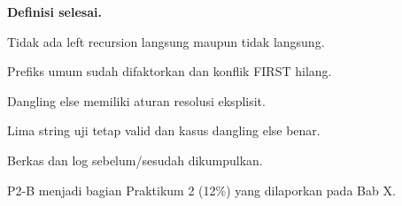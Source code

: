 \textbf{Definisi selesai.}
\begin{checklist}
  \item Tidak ada left recursion langsung maupun tidak langsung.
  \item Prefiks umum sudah difaktorkan dan konflik FIRST hilang.
  \item Dangling else memiliki aturan resolusi eksplisit.
  \item Lima string uji tetap valid dan kasus dangling else benar.
  \item Berkas  dan log sebelum/sesudah
        dikumpulkan.
\end{checklist}

P2-B menjadi bagian Praktikum 2 (12\%) yang dilaporkan pada Bab X.
